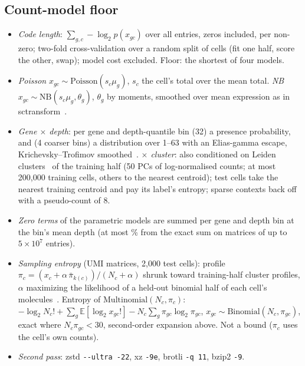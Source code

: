 \subsection{Count-model floor}
\begin{itemize}\itemsep 1pt
\item \emph{Code length}: $\sum_{g,c}-\log_2 p(x_{gc})$ over all entries, zeros included, per non-zero; two-fold
  cross-validation over a random split of cells (fit one half, score the other, swap); model cost excluded. Floor:
  the shortest of four models.
\item \emph{Poisson} $x_{gc}\sim\mathrm{Poisson}(s_c\mu_g)$, $s_c$ the cell's total over the mean total.
  \emph{NB} $x_{gc}\sim\mathrm{NB}(s_c\mu_g,\theta_g)$, $\theta_g$ by moments, smoothed over mean expression as in
  sctransform~\cite{hafemeister2019normalization}.
\item \emph{Gene $\times$ depth}: per gene and depth-quantile bin (32) a presence probability, and (4 coarser bins) a
  distribution over 1--63 with an Elias-gamma escape, Krichevsky--Trofimov smoothed~\cite{krichevsky1981performance}.
  \emph{$\times$ cluster}: also conditioned on Leiden clusters~\cite{traag2019louvain} of the training half (50 PCs of
  log-normalised counts; at most 200{,}000 training cells, others to the nearest centroid); test cells take the nearest
  training centroid and pay its label's entropy; sparse contexts back off with a pseudo-count of 8.
\item \emph{Zero terms} of the parametric models are summed per gene and depth bin at the bin's mean depth (at most
  \% from the exact sum on matrices of up to $5\times10^7$ entries).
\item \emph{Sampling entropy} (UMI matrices, 2{,}000 test cells): profile $\pi_c=(x_c+\alpha\,\bar\pi_{k(c)})/(N_c+\alpha)$
  shrunk toward training-half cluster profiles, $\alpha$ maximizing the likelihood of a held-out binomial half of each
  cell's molecules~\cite{batson2019molecular,neufeld2024inference}. Entropy of $\mathrm{Multinomial}(N_c,\pi_c)$:
  $-\log_2 N_c!+\sum_g\mathbb{E}[\log_2 x_{gc}!]-N_c\sum_g\pi_{gc}\log_2\pi_{gc}$,
  $x_{gc}\sim\mathrm{Binomial}(N_c,\pi_{gc})$, exact where $N_c\pi_{gc}<30$, second-order expansion above. Not a bound
  ($\pi_c$ uses the cell's own counts).
\item \emph{Second pass}: zstd \texttt{-{}-ultra -22}, xz \texttt{-9e}, brotli \texttt{-q 11}, bzip2 \texttt{-9}.
\end{itemize}

